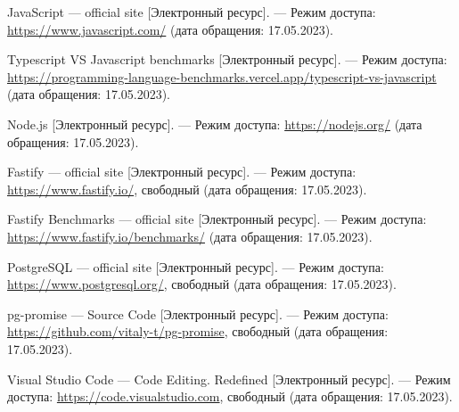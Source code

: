 \begin{thebibliography}{}
	JavaScript --- official site [Электронный ресурс]. --- Режим доступа: \url{https://www.javascript.com/} (дата обращения: 17.05.2023).
	
	Typescript VS Javascript benchmarks [Электронный ресурс]. --- Режим доступа: \url{https://programming-language-benchmarks.vercel.app/typescript-vs-javascript} (дата обращения: 17.05.2023).

	 Node.js [Электронный ресурс]. --- Режим доступа: \url{https://nodejs.org/} (дата обращения: 17.05.2023).
	
	Fastify --- official site [Электронный ресурс]. --- Режим доступа: \url{https://www.fastify.io/}, свободный (дата обращения: 17.05.2023).
	
	Fastify Benchmarks --- official site [Электронный ресурс]. --- Режим доступа: \url{https://www.fastify.io/benchmarks/} (дата обращения: 17.05.2023).

	PostgreSQL --- official site [Электронный ресурс]. --- Режим доступа: \url{https://www.postgresql.org/}, свободный (дата обращения: 17.05.2023).
	
	pg-promise --- Source Code [Электронный ресурс]. --- Режим доступа: \url{https://github.com/vitaly-t/pg-promise}, свободный (дата обращения: 17.05.2023).

	Visual Studio Code --- Code Editing. Redefined [Электронный ресурс]. --- Режим доступа: \url{https://code.visualstudio.com}, свободный (дата обращения: 17.05.2023).
	
%	
%	
%	
%	
\end{thebibliography}
\endgroup

\pagebreak